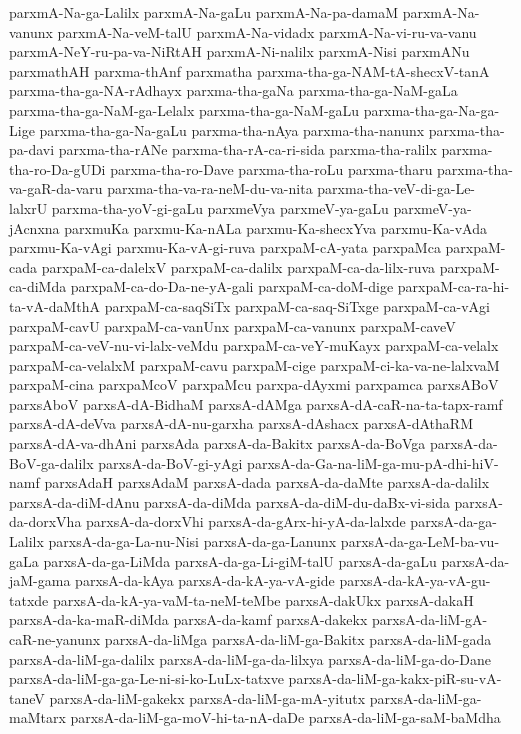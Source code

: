 {parxmA-Na-ga-Lalilx
parxmA-Na-gaLu
parxmA-Na-pa-damaM
parxmA-Na-vanunx
parxmA-Na-veM-talU
parxmA-Na-vidadx
parxmA-Na-vi-ru-va-vanu
parxmA-NeY-ru-pa-va-NiRtAH
parxmA-Ni-nalilx
parxmA-Nisi
parxmANu
parxmathAH
parxma-thAnf
parxmatha
parxma-tha-ga-NAM-tA-shecxV-tanA
parxma-tha-ga-NA-rAdhayx
parxma-tha-gaNa
parxma-tha-ga-NaM-gaLa
parxma-tha-ga-NaM-ga-Lelalx
parxma-tha-ga-NaM-gaLu
parxma-tha-ga-Na-ga-Lige
parxma-tha-ga-Na-gaLu
parxma-tha-nAya
parxma-tha-nanunx
parxma-tha-pa-davi
parxma-tha-rANe
parxma-tha-rA-ca-ri-sida
parxma-tha-ralilx
parxma-tha-ro-Da-gUDi
parxma-tha-ro-Dave
parxma-tha-roLu
parxma-tharu
parxma-tha-va-gaR-da-varu
parxma-tha-va-ra-neM-du-va-nita
parxma-tha-veV-di-ga-Le-lalxrU
parxma-tha-yoV-gi-gaLu
parxmeVya
parxmeV-ya-gaLu
parxmeV-ya-jAcnxna
parxmuKa
parxmu-Ka-nALa
parxmu-Ka-shecxYva
parxmu-Ka-vAda
parxmu-Ka-vAgi
parxmu-Ka-vA-gi-ruva
parxpaM-cA-yata
parxpaMca
parxpaM-cada
parxpaM-ca-dalelxV
parxpaM-ca-dalilx
parxpaM-ca-da-lilx-ruva
parxpaM-ca-diMda
parxpaM-ca-do-Da-ne-yA-gali
parxpaM-ca-doM-dige
parxpaM-ca-ra-hi-ta-vA-daMthA
parxpaM-ca-saqSiTx
parxpaM-ca-saq-SiTxge
parxpaM-ca-vAgi
parxpaM-cavU
parxpaM-ca-vanUnx
parxpaM-ca-vanunx
parxpaM-caveV
parxpaM-ca-veV-nu-vi-lalx-veMdu
parxpaM-ca-veY-muKayx
parxpaM-ca-velalx
parxpaM-ca-velalxM
parxpaM-cavu
parxpaM-cige
parxpaM-ci-ka-va-ne-lalxvaM
parxpaM-cina
parxpaMcoV
parxpaMcu
parxpa-dAyxmi
parxpamca
parxsABoV
parxsAboV
parxsA-dA-BidhaM
parxsA-dAMga
parxsA-dA-caR-na-ta-tapx-ramf
parxsA-dA-deVva
parxsA-dA-nu-garxha
parxsA-dAshacx
parxsA-dAthaRM
parxsA-dA-va-dhAni
parxsAda
parxsA-da-Bakitx
parxsA-da-BoVga
parxsA-da-BoV-ga-dalilx
parxsA-da-BoV-gi-yAgi
parxsA-da-Ga-na-liM-ga-mu-pA-dhi-hiV-namf
parxsAdaH
parxsAdaM
parxsA-dada
parxsA-da-daMte
parxsA-da-dalilx
parxsA-da-diM-dAnu
parxsA-da-diMda
parxsA-da-diM-du-daBx-vi-sida
parxsA-da-dorxVha
parxsA-da-dorxVhi
parxsA-da-gArx-hi-yA-da-lalxde
parxsA-da-ga-Lalilx
parxsA-da-ga-La-nu-Nisi
parxsA-da-ga-Lanunx
parxsA-da-ga-LeM-ba-vu-gaLa
parxsA-da-ga-LiMda
parxsA-da-ga-Li-giM-talU
parxsA-da-gaLu
parxsA-da-jaM-gama
parxsA-da-kAya
parxsA-da-kA-ya-vA-gide
parxsA-da-kA-ya-vA-gu-tatxde
parxsA-da-kA-ya-vaM-ta-neM-teMbe
parxsA-dakUkx
parxsA-dakaH
parxsA-da-ka-maR-diMda
parxsA-da-kamf
parxsA-dakekx
parxsA-da-liM-gA-caR-ne-yanunx
parxsA-da-liMga
parxsA-da-liM-ga-Bakitx
parxsA-da-liM-gada
parxsA-da-liM-ga-dalilx
parxsA-da-liM-ga-da-lilxya
parxsA-da-liM-ga-do-Dane
parxsA-da-liM-ga-ga-Le-ni-si-ko-LuLx-tatxve
parxsA-da-liM-ga-kakx-piR-su-vA-taneV
parxsA-da-liM-gakekx
parxsA-da-liM-ga-mA-yitutx
parxsA-da-liM-ga-maMtarx
parxsA-da-liM-ga-moV-hi-ta-nA-daDe
parxsA-da-liM-ga-saM-baMdha
}
